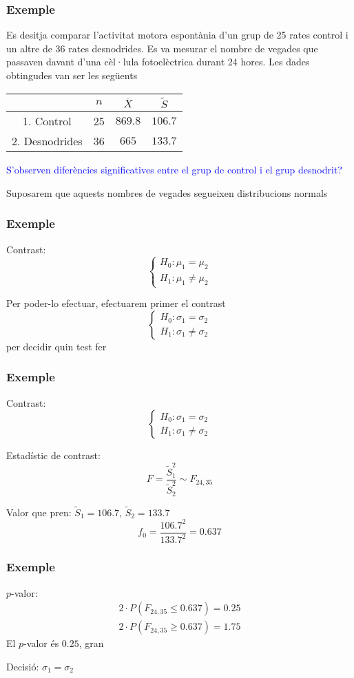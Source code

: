 \documentclass[12pt,t]{beamer}
\newcommand{\blue}[1]{\textcolor{blue}{#1}}
\renewcommand{\emph}[1]{{\color{red}#1}}
\renewcommand{\leq}{\leqslant}
\renewcommand{\geq}{\geqslant}
\theoremstyle{plain}
\theoremstyle{definition}
\begin{document}
\begin{frame}
\frametitle{Exemple}
Es desitja comparar l'activitat motora espontània d'un grup de 25 rates control i un altre de 36 rates desnodrides. Es va mesurar el nombre de vegades que passaven davant d'una cèl·lula fotoelèctrica durant 24 hores. Les dades obtingudes van ser les següents

\begin{center}
\begin{tabular}{|c|c|c|c|}
\hline
& $n$ & $\overline{X}$ & $\widetilde{S}$ \\ \hline
1. Control & 25 &  $869.8$ & $106.7$\\ \hline
2. Desnodrides & 36 & $665$ & $133.7$\\ \hline
\end{tabular}
\end{center}

\blue{S'observen diferències significatives entre el grup de control i el grup desnodrit? }\pause\medskip

\emph{Suposarem que aquests nombres de vegades segueixen  distribucions normals}
\end{frame}

\begin{frame}
\frametitle{Exemple}
\emph{Contrast}:
$$
\left\{\begin{array}{l}
H_0:\mu_1=\mu_2\\
H_1:\mu_1\neq \mu_2
\end{array}\right.
$$
\medskip

Per poder-lo efectuar, efectuarem primer el contrast
$$
\left\{\begin{array}{l}
H_0:\sigma_1=\sigma_2\\
H_1:\sigma_1\neq \sigma_2
\end{array}\right.
$$
per decidir quin test fer
\end{frame}

\begin{frame}
\frametitle{Exemple}


\emph{Contrast}:
$$
\left\{\begin{array}{l}
H_0:\sigma_1=\sigma_2\\
H_1:\sigma_1\neq \sigma_2
\end{array}\right.
$$

\emph{Estadístic de contrast}: 
$$
F=\frac{\widetilde{S}_1^2}{\widetilde{S}_2^2}\sim F_{24,35}
$$
\medskip

\emph{Valor que pren}: $\widetilde{S}_1=106.7$, $\widetilde{S}_2=133.7$
$$
f_0=\frac{106.7^2}{133.7^2}=0.637
$$

\end{frame}
\begin{frame}
\frametitle{Exemple}

\emph{$p$-valor}: 
$$
\begin{array}{l}
2\cdot P(F_{24,35}\leq 0.637)= 0.25\\
2\cdot P(F_{24,35}\geq 0.637)=1.75
\end{array}
$$
El $p$-valor és $0.25$, gran
\medskip

\emph{Decisió}:  $\sigma_1= \sigma_2$

\end{frame}
\end{document}
